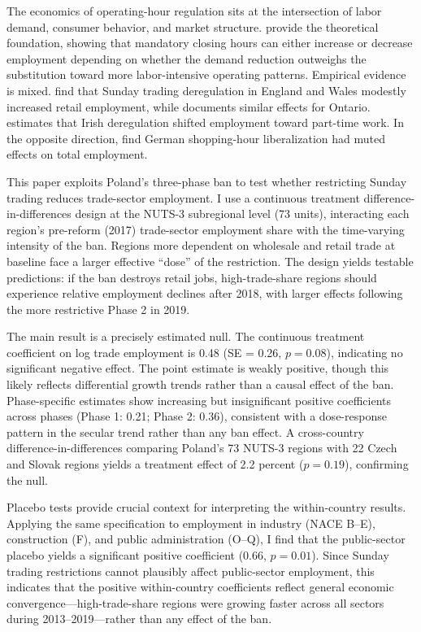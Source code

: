 \documentclass[12pt]{article}
\begin{document}
The economics of operating-hour regulation sits at the intersection of labor demand, consumer behavior, and market structure. \citet{BurdalCrain1997} provide the theoretical foundation, showing that mandatory closing hours can either increase or decrease employment depending on whether the demand reduction outweighs the substitution toward more labor-intensive operating patterns. Empirical evidence is mixed. \citet{GoosManning2005} find that Sunday trading deregulation in England and Wales modestly increased retail employment, while \citet{Skuterud2005} documents similar effects for Ontario. \citet{Redmond2012} estimates that Irish deregulation shifted employment toward part-time work. In the opposite direction, \citet{BirdicalSpiess2006} find German shopping-hour liberalization had muted effects on total employment.

This paper exploits Poland's three-phase ban to test whether restricting Sunday trading reduces trade-sector employment. I use a continuous treatment difference-in-differences design at the NUTS-3 subregional level (73 units), interacting each region's pre-reform (2017) trade-sector employment share with the time-varying intensity of the ban. Regions more dependent on wholesale and retail trade at baseline face a larger effective ``dose'' of the restriction. The design yields testable predictions: if the ban destroys retail jobs, high-trade-share regions should experience relative employment declines after 2018, with larger effects following the more restrictive Phase 2 in 2019.

The main result is a precisely estimated null. The continuous treatment coefficient on log trade employment is 0.48 (SE = 0.26, $p = 0.08$), indicating no significant negative effect. The point estimate is weakly positive, though this likely reflects differential growth trends rather than a causal effect of the ban. Phase-specific estimates show increasing but insignificant positive coefficients across phases (Phase 1: 0.21; Phase 2: 0.36), consistent with a dose-response pattern in the secular trend rather than any ban effect. A cross-country difference-in-differences comparing Poland's 73 NUTS-3 regions with 22 Czech and Slovak regions yields a treatment effect of 2.2 percent ($p = 0.19$), confirming the null.

Placebo tests provide crucial context for interpreting the within-country results. Applying the same specification to employment in industry (NACE B--E), construction (F), and public administration (O--Q), I find that the public-sector placebo yields a significant positive coefficient (0.66, $p = 0.01$). Since Sunday trading restrictions cannot plausibly affect public-sector employment, this indicates that the positive within-country coefficients reflect general economic convergence---high-trade-share regions were growing faster across all sectors during 2013--2019---rather than any effect of the ban.
\end{document}
